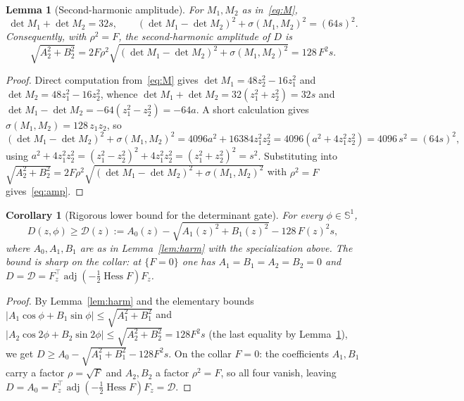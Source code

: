 \documentclass[11pt,reqno]{amsart}
\theoremstyle{plain}
\newtheorem{lemma}[theorem]{Lemma}
\newtheorem{corollary}[theorem]{Corollary}
\theoremstyle{definition}
\DeclareMathOperator{\adj}{adj}
\DeclareMathOperator{\Hess}{Hess}
\newcommand{\Sph}{\mathbb{S}}
\newcommand{\calD}{\mathcal{D}}
\newcommand{\Fz}{F_{z}}
\begin{document}
\begin{lemma}[Second-harmonic amplitude]\label{lem:amp}
For $M_1,M_2$ as in~\eqref{eq:M},
\begin{equation}\label{eq:detsum}
\det M_1+\det M_2=32s,
\qquad
(\det M_1-\det M_2)^2+\sigma(M_1,M_2)^2=(64s)^2.
\end{equation}
Consequently, with $\rho^2=F$, the second-harmonic amplitude of $D$ is
\begin{equation}\label{eq:amp}
\sqrt{A_2^2+B_2^2}=2F\rho^2\sqrt{(\det M_1-\det M_2)^2+\sigma(M_1,M_2)^2}=128\,F^2 s.
\end{equation}
\end{lemma}

\begin{proof}
Direct computation from~\eqref{eq:M} gives $\det M_1=48z_2^2-16z_1^2$ and $\det M_2=48z_1^2-16z_2^2$, whence $\det M_1+\det M_2=32(z_1^2+z_2^2)=32s$ and $\det M_1-\det M_2=-64(z_1^2-z_2^2)=-64a$. A short calculation gives $\sigma(M_1,M_2)=128\,z_1z_2$, so
\[
(\det M_1-\det M_2)^2+\sigma(M_1,M_2)^2=4096a^2+16384z_1^2z_2^2=4096(a^2+4z_1^2z_2^2)=4096\,s^2=(64s)^2,
\]
using $a^2+4z_1^2z_2^2=(z_1^2-z_2^2)^2+4z_1^2z_2^2=(z_1^2+z_2^2)^2=s^2$. Substituting into $\sqrt{A_2^2+B_2^2}=2F\rho^2\sqrt{(\det M_1-\det M_2)^2+\sigma(M_1,M_2)^2}$ with $\rho^2=F$ gives~\eqref{eq:amp}.
\end{proof}

\begin{corollary}[Rigorous lower bound for the determinant gate]\label{cor:Dbound}
For every $\phi\in\Sph^1$,
\begin{equation}\label{eq:Dbound}
D(z,\phi)\ge \calD(z):=A_0(z)-\sqrt{A_1(z)^2+B_1(z)^2}-128\,F(z)^2 s,
\end{equation}
where $A_0,A_1,B_1$ are as in Lemma~\ref{lem:harm} with the specialization above. The bound is sharp on the collar: at $\{F=0\}$ one has $A_1=B_1=A_2=B_2=0$ and $D=\calD=\Fz^{\!\top}\adj(-\tfrac12\Hess F)\Fz$.
\end{corollary}

\begin{proof}
By Lemma~\ref{lem:harm} and the elementary bounds $\lvert A_1\cos\phi+B_1\sin\phi\rvert\le\sqrt{A_1^2+B_1^2}$ and $\lvert A_2\cos2\phi+B_2\sin2\phi\rvert\le\sqrt{A_2^2+B_2^2}=128F^2s$ (the last equality by Lemma~\ref{lem:amp}), we get $D\ge A_0-\sqrt{A_1^2+B_1^2}-128F^2s$. On the collar $F=0$: the coefficients $A_1,B_1$ carry a factor $\rho=\sqrt{F}$ and $A_2,B_2$ a factor $\rho^2=F$, so all four vanish, leaving $D=A_0=\Fz^{\!\top}\adj(-\tfrac12\Hess F)\Fz=\calD$.
\end{proof}
\end{document}
